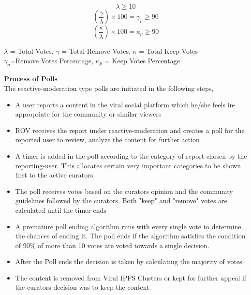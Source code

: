 \documentclass[10pt]{article}
\begin{document}
\begin{equation}
\lambda \geq10
\end{equation}
\begin{equation}
(\frac{\gamma}{\lambda}) \times  100 = \gamma_p \geq 90
\end{equation}
\begin{equation}
(\frac{\kappa}{\lambda}) \times  100 = \kappa_p \geq 90
\end{equation}
\begin{center}
$\lambda$ = Total Votes, $\gamma$ = Total Remove Votes, $\kappa$ = Total Keep Votes \\
$\gamma_p$=Remove Votes Percentage, $\kappa_p$ = Keep Votes Percentage\\
\end{center}

\textbf{Process of Polls}\\

The reactive-moderation type polls are initiated  in the following steps,
\begin{itemize}[leftmargin=+0.2in]
\item A user reports a content in the viral social platform which he/she feels in-appropriate for the community or similar viewers
\item ROV receives the report under reactive-moderation and creates a poll for the reported user to review, analyze the content for further action
\item A timer is added in the poll according to the category of report chosen by the reporting-user.  This allocates certain very important categories to be shown first to the active curators.
\item The poll receives votes based on the curators opinion and the community guidelines followed by the curators. Both "keep" and "remove" votes are calculated until the timer ends
\item A premature poll ending algorithm runs with every single vote to determine the chances of ending it.  The poll ends if the algorithm satisfies the condition of 90\% of more than 10 votes are voted towards a single decision.
\item After the Poll ends the decision is taken by calculating the majority of votes. 
\item The content is removed from Viral IPFS Clusters or kept for further appeal if the curators decision was to keep the content.
\end{itemize}
\end{document}
